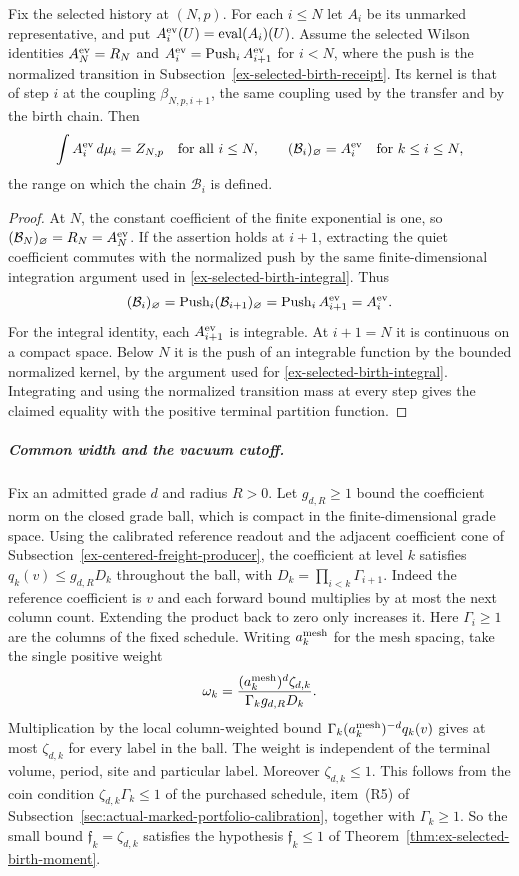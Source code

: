 \begin{lemma}
\label{lem:ex-selected-birth-denominator}
Fix the selected history at $(N,p)$. For each $i\le N$ let $A_i$
be its unmarked representative, and put $A_i^{\rm ev}(U)=\operatorname{eval}(A_i)(U)$.
Assume the selected Wilson identities
$A_N^{\rm ev}=R_N$ and $A_i^{\rm ev}=\operatorname{Push}_i A_{i+1}^{\rm ev}$ for $i<N$,
where the push is the normalized transition in
Subsection~\ref{ex-selected-birth-receipt}. Its kernel is that of step $i$
at the coupling $\beta_{N,p,i+1}$, the same coupling used by the
transfer and by the birth chain. Then
\[
 \int A_i^{\rm ev}\,d\mu_i=Z_{N,p}\quad\text{for all }i\le N,
 \qquad
 (\mathcal B_i)_\varnothing=A_i^{\rm ev}\quad\text{for }k\le i\le N,
\]
the range on which the chain $\mathcal B_i$ is defined.
\end{lemma}
\begin{proof}
At $N$, the constant coefficient of the finite exponential is one,
so $(\mathcal B_N)_\varnothing=R_N=A_N^{\rm ev}$. If the assertion holds at
$i+1$, extracting the quiet coefficient commutes with the normalized
push by the same finite-dimensional integration argument used in
\eqref{ex-selected-birth-integral}. Thus
\[
 (\mathcal B_i)_\varnothing
 =\operatorname{Push}_i(\mathcal B_{i+1})_\varnothing
 =\operatorname{Push}_i A_{i+1}^{\rm ev}=A_i^{\rm ev}.
\]
For the integral identity, each $A_{i+1}^{\rm ev}$ is integrable. At
$i+1=N$ it is continuous on a compact space. Below $N$ it is the push of
an integrable function by the bounded normalized kernel, by the argument
used for \eqref{ex-selected-birth-integral}. Integrating and using the
normalized transition mass at every step gives the claimed equality
with the positive terminal partition function.
\end{proof}

\subparagraph{Common width and the vacuum cutoff.}
Fix an admitted grade $d$ and radius $R>0$. Let $g_{d,R}\ge1$
bound the coefficient norm on the closed grade ball, which is
compact in the finite-dimensional grade space. Using the
calibrated reference readout and the adjacent coefficient cone of
Subsection~\ref{ex-centered-freight-producer}, the coefficient at level
$k$ satisfies $q_k(v)\le g_{d,R}D_k$ throughout the ball, with
$D_k=\prod_{i<k}\Gamma_{i+1}$. Indeed the reference coefficient is
$v$ and each forward bound multiplies by at most the next column
count. Extending the product back to zero only increases it. Here
$\Gamma_i\ge1$ are the columns of the fixed schedule. Writing $a_k^{\rm mesh}$
for the mesh spacing, take the single positive weight
\[
 \omega_k=\frac{(a_k^{\rm mesh})^d\zeta_{d,k}}
                 {\Gamma_k g_{d,R}D_k}.
\]
Multiplication by the local column-weighted bound
$\Gamma_k(a_k^{\rm mesh})^{-d}q_k(v)$ gives at most
$\zeta_{d,k}$ for every label in the ball. The weight is independent
of the terminal volume, period, site and particular label. Moreover
$\zeta_{d,k}\le1$. This follows from the coin condition
$\zeta_{d,k}\Gamma_k\le1$ of the purchased schedule, item~(R5) of
Subsection~\ref{sec:actual-marked-portfolio-calibration}, together with
$\Gamma_k\ge1$. So the small bound $\mathfrak f_k=\zeta_{d,k}$ satisfies
the hypothesis $\mathfrak f_k\le1$ of
Theorem~\ref{thm:ex-selected-birth-moment}.

